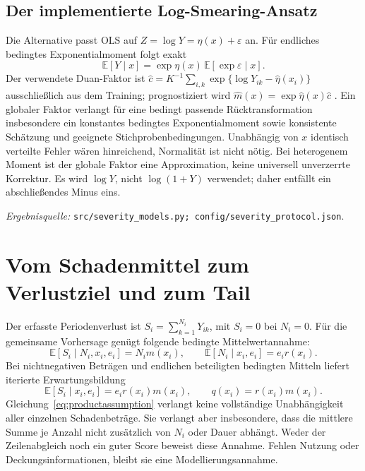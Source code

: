\documentclass[11pt,a4paper]{article}
\newcommand{\E}{\mathbb E}
\newcommand{\evidence}[1]{\par{\footnotesize\textit{Ergebnisquelle:} \nolinkurl{#1}.}\par}
\begin{document}
\subsection*{Der implementierte Log-Smearing-Ansatz}
Die Alternative passt OLS auf $Z=\log Y=\eta(x)+\varepsilon$ an. Für endliches bedingtes Exponentialmoment folgt exakt
\begin{equation}
 \E[Y\mid x]=\exp\eta(x)\,\E[\exp\varepsilon\mid x].
\end{equation}
Der verwendete Duan-Faktor ist $\widehat c=K^{-1}\sum_{i,k}\exp\{\log Y_{ik}-\widehat\eta(x_i)\}$ ausschließlich aus dem Training; prognostiziert wird $\widehat m(x)=\exp\widehat\eta(x)\widehat c$ \cite{duan}. Ein globaler Faktor verlangt für eine bedingt passende Rücktransformation insbesondere ein konstantes bedingtes Exponentialmoment sowie konsistente Schätzung und geeignete Stichprobenbedingungen. Unabhängig von $x$ identisch verteilte Fehler wären hinreichend, Normalität ist nicht nötig. Bei heterogenem Moment ist der globale Faktor eine Approximation, keine universell unverzerrte Korrektur. Es wird $\log Y$, nicht $\log(1+Y)$ verwendet; daher entfällt ein abschließendes Minus eins.
\evidence{src/severity_models.py; config/severity_protocol.json}

\clearpage
\section{Vom Schadenmittel zum Verlustziel und zum Tail}
Der erfasste Periodenverlust ist $S_i=\sum_{k=1}^{N_i}Y_{ik}$, mit $S_i=0$ bei $N_i=0$. Für die gemeinsame Vorhersage genügt folgende bedingte Mittelwertannahme:
\begin{equation}\label{eq:productassumption}
 \E[S_i\mid N_i,x_i,e_i]=N_i m(x_i),\qquad
 \E[N_i\mid x_i,e_i]=e_i r(x_i).
\end{equation}
Bei nichtnegativen Beträgen und endlichen beteiligten bedingten Mitteln liefert iterierte Erwartungsbildung
\begin{equation}
 \E[S_i\mid x_i,e_i]=e_i r(x_i)m(x_i),\qquad q(x_i)=r(x_i)m(x_i).
\end{equation}
Gleichung~\eqref{eq:productassumption} verlangt keine vollständige Unabhängigkeit aller einzelnen Schadenbeträge. Sie verlangt aber insbesondere, dass die mittlere Summe je Anzahl nicht zusätzlich von $N_i$ oder Dauer abhängt. Weder der Zeilenabgleich noch ein guter Score beweist diese Annahme. Fehlen Nutzung oder Deckungsinformationen, bleibt sie eine Modellierungsannahme.
\end{document}
